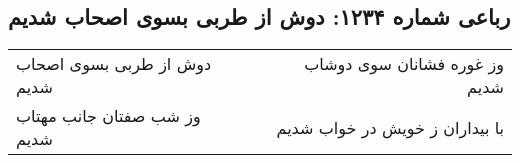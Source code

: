 \begin{center}
\section*{رباعی شماره ۱۲۳۴: دوش از طربی بسوی اصحاب شدیم}
\label{sec:1234}
\begin{longtable}{l p{0.5cm} r}
دوش از طربی بسوی اصحاب شدیم
&&
وز غوره فشانان سوی دوشاب شدیم
\\
وز شب صفتان جانب مهتاب شدیم
&&
با بیداران ز خویش در خواب شدیم
\\
\end{longtable}
\end{center}
